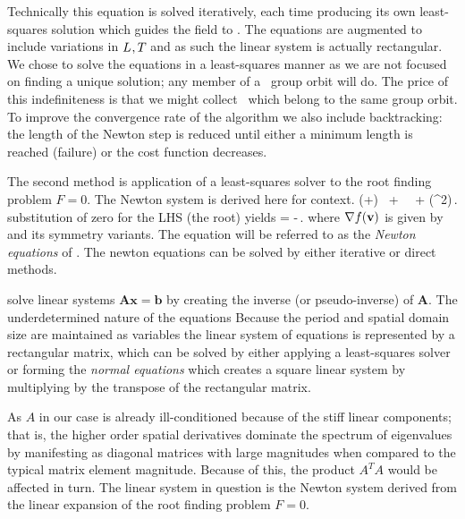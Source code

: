 

Technically this equation is solved iteratively, each time producing its own least-squares solution which guides the field to \twot.
The equations are augmented to include variations in ${L_{}},{T_{}}$ and as
such the linear system is actually rectangular.
We chose to solve the equations in a least-squares manner as we are not focused on finding a unique
solution; any member of a \twots\ group orbit will do. The price of this indefiniteness is that we might
collect \twots\ which belong to the same group orbit. To improve the convergence rate of the algorithm we also include backtracking: the length of the Newton step is reduced until either a minimum length is reached (failure) or the cost function decreases.

The second method is application of a least-squares solver
to the root finding problem $F=0$. The Newton system is
derived here for context.
\beq
{}(\statev+\delta\statev)\approx
\goveqn\ + \nabla\goveqn\ \delta\statev\ + (\delta\statev^2)\,.
\eeq
substitution of zero for the LHS (the root) yields
\beq \label{e-newton}
\nabla\goveqn\delta\statev = -\goveqn \,.
\eeq
where $\nabla f{(\mathbf{v})}$ is given by  and its
symmetry variants. The equation  will be referred to as the \textit{Newton equations} of . The newton equations can be solved by either iterative or direct methods.

solve linear systems $\mathbf{A}\mathbf{x} = \mathbf{b}$ by creating the inverse (or
pseudo-inverse) of $\mathbf{A}$. The underdetermined nature of the equations Because the period and
spatial domain size are maintained as variables
the linear system of equations is represented by a rectangular matrix,
which can be solved by either applying a least-squares solver
or forming the \textit{normal equations} which creates a square
linear system by multiplying by the transpose of the rectangular matrix.

As $A$ in our case is already ill-conditioned because of the stiff linear components;
that is, the higher order spatial derivatives dominate the spectrum of eigenvalues
by manifesting as diagonal matrices with large magnitudes when compared to the typical
matrix element magnitude. Because of this, the product $A^{T}A$ would be affected in turn.
The linear system in question is the Newton system derived from the linear expansion of the
root finding problem $F=0$.

